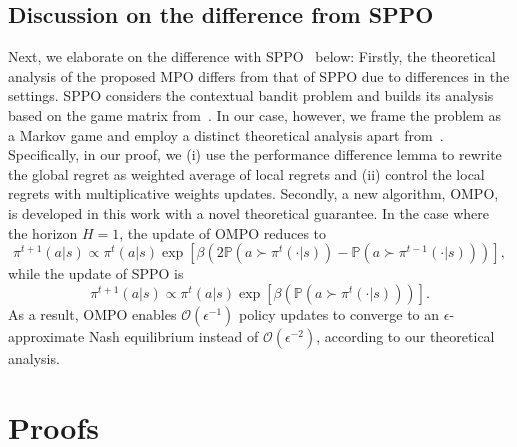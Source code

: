 {\subsection{Discussion on the difference from SPPO}
Next, we elaborate on the difference with SPPO~\citep{wu2024self} below: Firstly, the theoretical analysis of the proposed MPO differs from that of SPPO due to differences in the settings. SPPO considers the contextual bandit problem and builds its analysis based on the game matrix from~\citet{freund1999adaptive}. In our case, however, we frame the problem as a Markov game and employ a distinct theoretical analysis apart from~\citet{freund1999adaptive}. Specifically, in our proof, we (i) use the performance difference lemma to rewrite the global regret as weighted average of local regrets and (ii) control the local regrets with multiplicative weights updates. Secondly, a new algorithm, OMPO, is developed in this work with a novel theoretical guarantee. In the case where the horizon $H = 1$, the update of OMPO reduces to $$\pi^{t+1}(a|s) \propto \pi^t(a|s) \exp{[\beta (2\mathbb{P}(a\succ \pi^t(\cdot|s)) - \mathbb{P}(a\succ \pi^{t-1}(\cdot|s)))]},$$ while the update of SPPO is $$ \pi^{t+1}(a|s) \propto \pi^t(a|s) \exp{[\beta (\mathbb{P}(a\succ \pi^t(\cdot|s)))]}.$$ As a result, OMPO enables \( \mathcal{O}(\epsilon^{-1}) \) policy updates to converge to an \( \epsilon \)-approximate Nash equilibrium instead of \( \mathcal{O}(\epsilon^{-2}) \), according to our theoretical analysis.
}


\section{Proofs}
\label{sec:proof}
